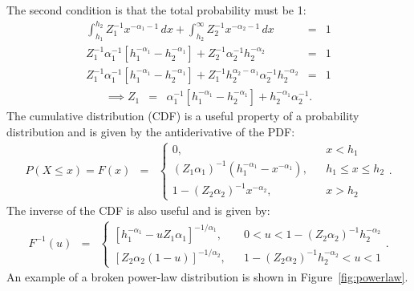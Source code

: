 \documentclass[manuscript]{aastex}
\begin{document}
The second condition is that the total probability must be 1:
\begin{eqnarray}
\int_{h_1}^{h_2} Z_1^{-1} x^{-\alpha_1 - 1} \, dx
+
\int_{h_2}^\infty Z_2^{-1} x^{-\alpha_2 - 1} \, dx
&=& 1 \\
Z_1^{-1}\alpha_1^{-1}\left[h_1^{-\alpha_1} - h_2^{-\alpha_1}\right]
+
Z_2^{-1}\alpha_2^{-1}h_2^{-\alpha_2}
&=& 1 \\
Z_1^{-1}\alpha_1^{-1}\left[h_1^{-\alpha_1} - h_2^{-\alpha_1}\right]
+
Z_1^{-1}h_2^{\alpha_2-\alpha_1}\alpha_2^{-1}h_2^{-\alpha_2}
&=& 1
\end{eqnarray}
\begin{eqnarray}
\implies
Z_1 &=& \alpha_1^{-1}\left[h_1^{-\alpha_1} - h_2^{-\alpha_1}\right]
+
h_2^{-\alpha_1}\alpha_2^{-1}.
\end{eqnarray}
The cumulative distribution (CDF) is a useful property of a probability
distribution and is given by the antiderivative of the PDF:
\begin{eqnarray}
P(X \leq x) = F(x) &=& 
\left\{
\begin{array}{lcr}
0, & & x < h_1 \\
(Z_1\alpha_1)^{-1}\left(h_1^{-\alpha_1} - x^{-\alpha_1}\right), & & h_1 \leq x \leq h_2 \\
1 - (Z_2\alpha_2)^{-1}x^{-\alpha_2}, & & x > h_2 
\end{array}
\right.
.
\end{eqnarray}
The inverse of the CDF is also useful and is given by:
\begin{eqnarray}
F^{-1}(u) &=& 
\left\{
\begin{array}{lcr}
\left[h_1^{-\alpha_1} - uZ_1\alpha_1\right]^{-1/\alpha_1}, & & 0 < u < 1 - (Z_2\alpha_2)^{-1}h_2^{-\alpha_2}\\
\left[Z_2\alpha_2(1-u)\right]^{-1/\alpha_2},& & 1 - (Z_2\alpha_2)^{-1}h_2^{-\alpha_2}< u < 1
\end{array}
\right.
.
\end{eqnarray}
An example of a broken power-law distribution is shown in Figure~\ref{fig:powerlaw}.
\end{document}
